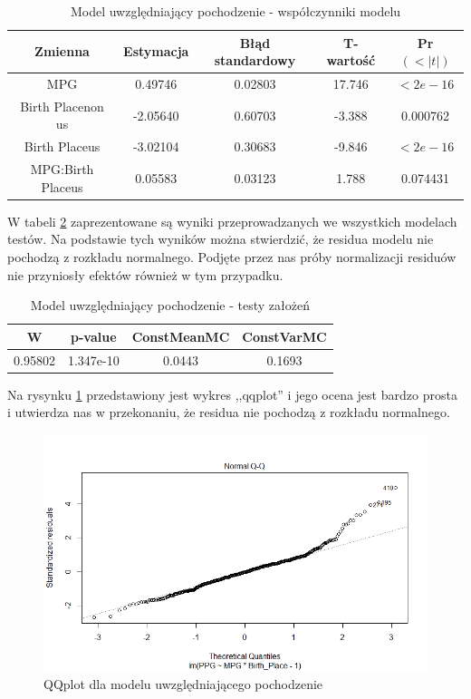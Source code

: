 \documentclass[11pt,a4paper]{article}
\begin{document}
\begin{table}[H]
	\begin{center}
		\begin{tabular}{| c | c | c | c | c |}
			\hline
			Zmienna & Estymacja & Błąd standardowy & T-wartość & Pr$(<|t|)$\\ \hline
			MPG    &            0.49746  &  0.02803 & 17.746 & $< 2e-16$\\ \hline
			Birth Placenon us & -2.05640 &   0.60703&  -3.388 & 0.000762 \\ \hline
			Birth Placeus   &  -3.02104  &  0.30683 & -9.846  & $< 2e-16$ \\ \hline
			MPG:Birth Placeus & 0.05583  &  0.03123 &  1.788 & 0.074431 \\ \hline
		\end{tabular}
		\caption{Model uwzględniający pochodzenie - współczynniki modelu}
		\label{origin}
	\end{center}
\end{table}
W tabeli \ref{zalozenia_origin} zaprezentowane są wyniki przeprowadzanych we wszystkich modelach testów. Na podstawie tych wyników można stwierdzić, że residua modelu nie pochodzą z rozkładu normalnego. Podjęte przez nas próby normalizacji residuów nie przyniosły efektów również w tym przypadku.
\begin{table}[H]
	\begin{center}
		\begin{tabular}{| c | c | c | c |}
			\hline
			W & p-value & ConstMeanMC & ConstVarMC\\ \hline
			0.95802 & 1.347e-10 & 0.0443 & 0.1693 \\ \hline
		\end{tabular}
		\caption{Model uwzględniający pochodzenie - testy założeń}
		\label{zalozenia_origin}
	\end{center}
\end{table}
Na rysynku \ref{qqplot_origin} przedstawiony jest wykres ,,qqplot'' i jego ocena jest bardzo prosta i utwierdza nas w przekonaniu, że residua nie pochodzą z rozkładu normalnego.
\begin{figure}[t]
\includegraphics[width=\textwidth]{origin_2}
\caption{QQplot dla modelu uwzględniającego pochodzenie}
\label{qqplot_origin}
\centering
\end{figure}
\end{document}
